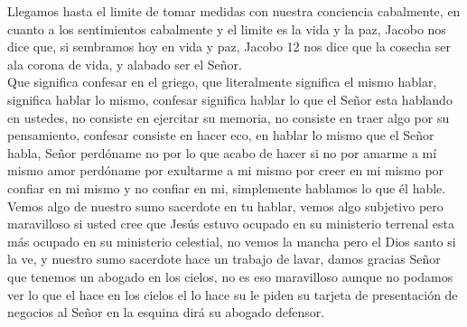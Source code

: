 \documentclass[12pt]{article}
\begin{document}
Llegamos hasta el limite de tomar medidas con nuestra conciencia cabalmente, en cuanto a los sentimientos cabalmente y el limite es la vida y la paz, Jacobo nos dice que, si sembramos hoy en vida y paz, Jacobo 12 nos dice que la cosecha ser ala corona de vida, y alabado ser el Señor. \\

Que significa confesar en el griego, que literalmente significa el mismo hablar, significa hablar lo mismo, confesar significa hablar lo que el Señor esta hablando en ustedes, no consiste en ejercitar su memoria, no consiste en traer algo por su pensamiento, confesar consiste en hacer eco, en hablar lo mismo que el Señor habla, Señor perdóname no por lo que acabo de hacer si no por amarme a mí mismo amor perdóname por exultarme a mi mismo por creer en mi mismo por confiar en mi mismo y no confiar en mi, simplemente hablamos lo que él hable.\\

Vemos algo de nuestro sumo sacerdote en tu hablar, vemos algo subjetivo pero maravilloso si usted cree que Jesús estuvo ocupado en su ministerio terrenal esta más ocupado en su ministerio celestial, no vemos la mancha pero el Dios santo si la ve, y nuestro sumo sacerdote hace un trabajo de lavar, damos gracias Señor que tenemos un abogado en los cielos, no es eso maravilloso aunque no podamos ver lo que el hace en los cielos el lo hace su le piden su tarjeta de presentación de negocios al Señor en la esquina dirá su abogado defensor.\\
\end{document}
